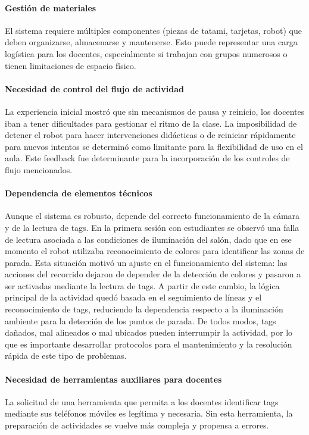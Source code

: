 \documentclass{prgrado}
\begin{document}
\paragraph{Gestión de materiales} El sistema requiere múltiples componentes (piezas de tatami, tarjetas, robot) que deben organizarse, almacenarse y mantenerse. Esto puede representar una carga logística para los docentes, especialmente si trabajan con grupos numerosos o tienen limitaciones de espacio físico.
\paragraph{Necesidad de control del flujo de actividad} La experiencia inicial mostró que sin mecanismos de pausa y reinicio, los docentes iban a tener dificultades para gestionar el ritmo de la clase. La imposibilidad de detener el robot para hacer intervenciones didácticas o de reiniciar rápidamente para nuevos intentos se determinó como limitante para la flexibilidad de uso en el aula. Este feedback fue determinante para la incorporación de los controles de flujo mencionados.
\paragraph{Dependencia de elementos técnicos} Aunque el sistema es robusto, depende del correcto funcionamiento de la cámara y de la lectura de tags. En la primera sesión con estudiantes se observó una falla de lectura asociada a las condiciones de iluminación del salón, dado que en ese momento el robot utilizaba reconocimiento de colores para identificar las zonas de parada. Esta situación motivó un ajuste en el funcionamiento del sistema: las acciones del recorrido dejaron de depender de la detección de colores y pasaron a ser activadas mediante la lectura de tags. A partir de este cambio, la lógica principal de la actividad quedó basada en el seguimiento de líneas y el reconocimiento de tags, reduciendo la dependencia respecto a la iluminación ambiente para la detección de los puntos de parada. De todos modos, tags dañados, mal alineados o mal ubicados pueden interrumpir la actividad, por lo que es importante desarrollar protocolos para el mantenimiento y la resolución rápida de este tipo de problemas.
\paragraph{Necesidad de herramientas auxiliares para docentes} La solicitud de una herramienta que permita a los docentes identificar tags mediante sus teléfonos móviles es legítima y necesaria. Sin esta herramienta, la preparación de actividades se vuelve más compleja y propensa a errores.
\end{document}
